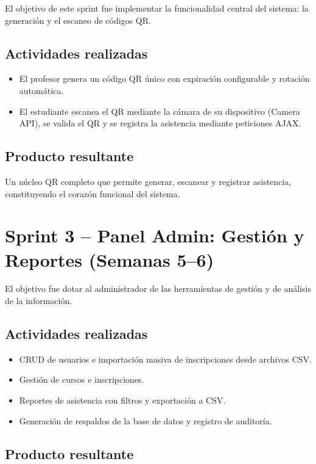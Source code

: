\documentclass[12pt, letterpaper, oneside]{report}
\begin{document}
El objetivo de este sprint fue implementar la funcionalidad central del sistema: la generaci\'on y el escaneo de c\'odigos QR.

\subsection{Actividades realizadas}

\begin{itemize}
  \item El profesor genera un c\'odigo QR \'unico con expiraci\'on configurable y rotaci\'on autom\'atica.
  \item El estudiante escanea el QR mediante la c\'amara de su dispositivo (Camera API), se valida el QR y se registra la asistencia mediante peticiones AJAX.
\end{itemize}

\subsection{Producto resultante}

Un n\'ucleo QR completo que permite generar, escanear y registrar asistencia, constituyendo el coraz\'on funcional del sistema.

\section{Sprint 3 -- Panel Admin: Gesti\'on y Reportes (Semanas 5--6)}

El objetivo fue dotar al administrador de las herramientas de gesti\'on y de an\'alisis de la informaci\'on.

\subsection{Actividades realizadas}

\begin{itemize}
  \item CRUD de usuarios e importaci\'on masiva de inscripciones desde archivos CSV.
  \item Gesti\'on de cursos e inscripciones.
  \item Reportes de asistencia con filtros y exportaci\'on a CSV.
  \item Generaci\'on de respaldos de la base de datos y registro de auditor\'ia.
\end{itemize}

\subsection{Producto resultante}
\end{document}
